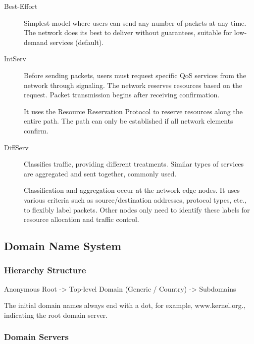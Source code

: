 \documentclass[11pt,journal,compsoc]{IEEEtran}
\begin{document}
\begin{description}
    \item[Best-Effort] Simplest model where users can send any number of packets at any time. The network does its best to deliver without guarantees, suitable for low-demand services (default).
    
    \item[IntServ] Before sending packets, users must request specific QoS services from the network through signaling. The network reserves resources based on the request. Packet transmission begins after receiving confirmation.
    
    It uses the Resource Reservation Protocol to reserve resources along the entire path. The path can only be established if all network elements confirm.
    
    \item[DiffServ] Classifies traffic, providing different treatments. Similar types of services are aggregated and sent together, commonly used.
    
    Classification and aggregation occur at the network edge nodes. It uses various criteria such as source/destination addresses, protocol types, etc., to flexibly label packets. Other nodes only need to identify these labels for resource allocation and traffic control.
\end{description}


\subsection{Domain Name System}


\subsubsection{Hierarchy Structure}

Anonymous Root -> Top-level Domain (Generic / Country) -> Subdomains

The initial domain names always end with a dot, for example, www.kernel.org., indicating the root domain server.

\subsubsection{Domain Servers}
\end{document}
